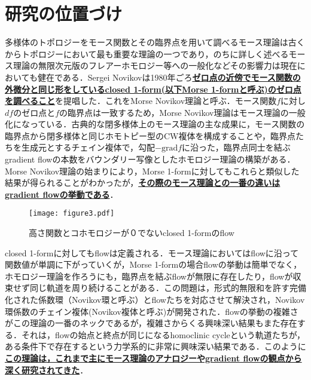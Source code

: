 \documentclass[11pt,a4j,dvipdfmx]{jarticle} 					%
\newcommand{\研究課題名}{象の卵}
\newcommand{\研究機関名}{京都大学}
\newcommand{\研究代表者氏名}{福士謙二}
\begin{document}

\section{研究の位置づけ}

\noindent
{}

多様体のトポロジーをモース関数とその臨界点を用いて調べるモース理論は古くからトポロジーにおいて最も重要な理論の一つであり，のちに詳しく述べるモース理論の無限次元版のフレアーホモロジー等への一般化などその影響力は現在においても健在である．Sergei Novikovは1980年ごろ\textbf{\ul{ゼロ点の近傍でモース関数の外微分と同じ形をしているclosed 1-form(以下Morse 1-formと呼ぶ)のゼロ点を調べること}}を提唱した．これをMorse Novikov理論と呼ぶ．モース関数$f$に対し$df$のゼロ点と$f$の臨界点は一致するため，Morse Novikov理論はモース理論の一般化になっている．古典的な閉多様体上のモース理論の主な成果に，モース関数の臨界点から閉多様体と同じホモトピー型のCW複体を構成することや，臨界点たちを生成元とするチェイン複体で，勾配$-\text{grad} f$に沿った，臨界点同士を結ぶgradient flowの本数をバウンダリー写像としたホモロジー理論の構築がある．
Morse Novikov理論の始まりにより，Morse 1-formに対してもこれらと類似した結果が得られることがわかったが，\textbf{\ul{その際のモース理論との一番の違いはgradient flowの挙動である}}．
\begin{wrapfigure}[11]{r}[0mm]{10zw}
    \vspace*{-\intextsep} %
	\texttt{[image: figure3.pdf]}
	\caption{高さ関数とコホモロジーが０でないclosed 1-formのflow}
\end{wrapfigure}
closed 1-formに対してもflowは定義される．モース理論においてはflowに沿って関数値が単調に下がっていくが，Morse 1-formの場合flowの挙動は簡単でなく，ホモロジー理論を作ろうにも，臨界点を結ぶflowが無限に存在したり，flowが収束せず同じ軌道を周り続けることがある．この問題は，形式的無限和を許す完備化された係数環（Novikov環と呼ぶ）とflowたちを対応させて解決され，Novikov環係数のチェイン複体(Novikov複体と呼ぶ)が開発された．flowの挙動の複雑さがこの理論の一番のネックであるが，複雑さからくる興味深い結果もまた存在する．それは，flowの始点と終点が同じになるhomoclinic cycleという軌道たちが，ある条件下で存在するという力学系的に非常に興味深い結果である．このように\textbf{\ul{この理論は，これまで主にモース理論のアナロジーやgradient flowの観点から深く研究されてきた}}．
\end{document}
